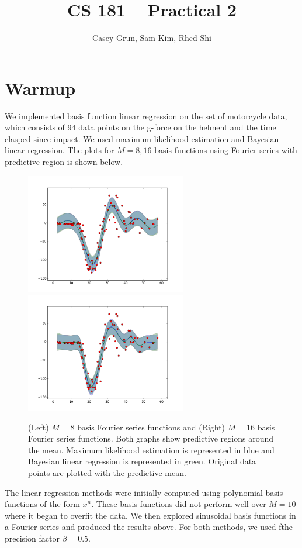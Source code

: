 \documentclass[11pt]{amsart}
\title{CS 181 -- Practical 2}
\author{Casey Grun, Sam Kim, Rhed Shi}
\begin{document}
\maketitle

\section{Warmup}

We implemented basis function linear regression on the set of motorcycle data, which consists of 94 data points on the g-force on the helment and the time elasped since impact. We used maximum likelihood estimation and Bayesian linear regression. The plots for $M = 8, 16$ basis functions using Fourier series with predictive region is shown below. 

\begin{figure}[h]
	\centering
	\includegraphics[width=7cm]{warmup_fourier_8}
	\includegraphics[width=7cm]{warmup_fourier_16}\\
	\caption{(Left) $M = 8$ basis Fourier series functions and (Right) $M = 16$ basis Fourier series functions. Both graphs show predictive regions around the mean. Maximum likelihood estimation is represented in blue and Bayesian linear regression is represented in green. Original data points are plotted with the predictive mean.}
\end{figure}

The linear regression methods were initially computed using polynomial basis functions of the form $x^n$. These basis functions did not perform well over $M = 10$ where it began to overfit the data. We then explored sinusoidal basis functions in a Fourier series and produced the results above. For both methods, we used fthe precision factor $\beta = 0.5$. \\
\end{document}
